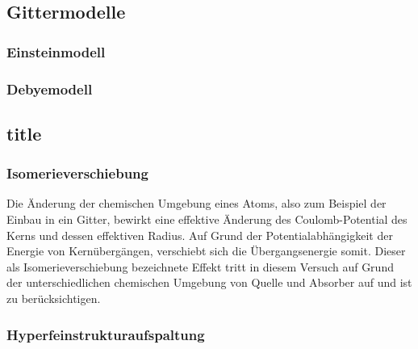 \subsection{Gittermodelle}

\subsubsection{Einsteinmodell}

\subsubsection{Debyemodell}

\subsection{title}

\subsubsection{Isomerieverschiebung}

Die Änderung der chemischen Umgebung eines Atoms, also zum Beispiel der Einbau in ein Gitter, bewirkt eine effektive Änderung des Coulomb-Potential des Kerns und dessen effektiven Radius. Auf Grund der Potentialabhängigkeit der Energie von Kernübergängen, verschiebt sich die Übergangsenergie somit. Dieser als Isomerieverschiebung bezeichnete Effekt tritt in diesem Versuch auf Grund der unterschiedlichen chemischen Umgebung von Quelle und Absorber auf und ist zu berücksichtigen.



\subsubsection{Hyperfeinstrukturaufspaltung}



